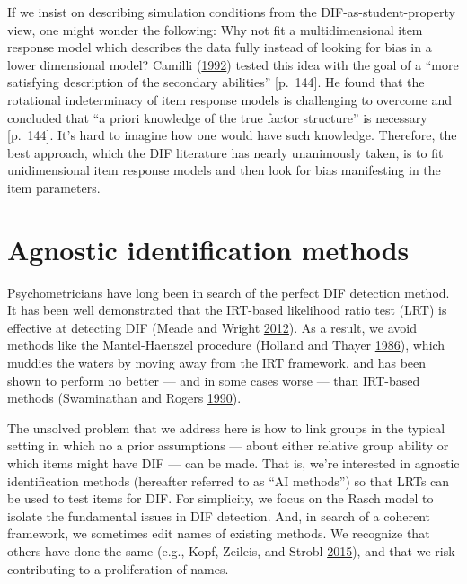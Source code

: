 \documentclass[
  11pt,
]{article}
\begin{document}
If we insist on describing simulation conditions from the DIF-as-student-property view, one might wonder the following: Why not fit a multidimensional item response model which describes the data fully instead of looking for bias in a lower dimensional model? Camilli (\protect\hyperlink{ref-camilli1992conceptual}{1992}) tested this idea with the goal of a \enquote{more satisfying description of the secondary abilities} {[}p.~144{]}. He found that the rotational indeterminacy of item response models is challenging to overcome and concluded that \enquote{a priori knowledge of the true factor structure} is necessary {[}p.~144{]}. It's hard to imagine how one would have such knowledge. Therefore, the best approach, which the DIF literature has nearly unanimously taken, is to fit unidimensional item response models and then look for bias manifesting in the item parameters.

\hypertarget{agnostic-identification-methods}{%
\section{Agnostic identification methods}\label{agnostic-identification-methods}}

Psychometricians have long been in search of the perfect DIF detection method. It has been well demonstrated that the IRT-based likelihood ratio test (LRT) is effective at detecting DIF (Meade and Wright \protect\hyperlink{ref-meade2012solving}{2012}). As a result, we avoid methods like the Mantel-Haenszel procedure (Holland and Thayer \protect\hyperlink{ref-holland1986differential}{1986}), which muddies the waters by moving away from the IRT framework, and has been shown to perform no better --- and in some cases worse --- than IRT-based methods (Swaminathan and Rogers \protect\hyperlink{ref-swaminathan1990detecting}{1990}).

The unsolved problem that we address here is how to link groups in the typical setting in which no a prior assumptions --- about either relative group ability or which items might have DIF --- can be made. That is, we're interested in agnostic identification methods (hereafter referred to as \enquote{AI methods}) so that LRTs can be used to test items for DIF. For simplicity, we focus on the Rasch model to isolate the fundamental issues in DIF detection. And, in search of a coherent framework, we sometimes edit names of existing methods. We recognize that others have done the same (e.g., Kopf, Zeileis, and Strobl \protect\hyperlink{ref-kopf2015framework}{2015}), and that we risk contributing to a proliferation of names.
\end{document}

